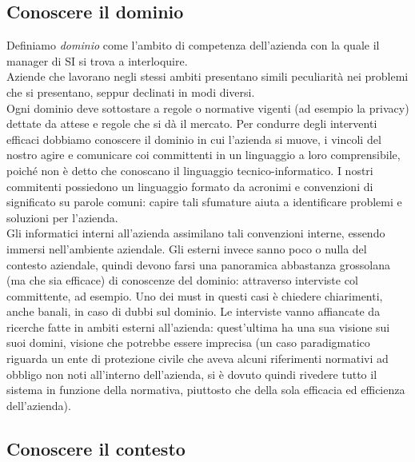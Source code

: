 \subsection{Conoscere il dominio}
Definiamo \textit{dominio} come l'ambito di competenza dell'azienda con la quale 
il manager di SI si trova a interloquire. \\
Aziende che lavorano negli stessi ambiti presentano simili peculiarit\`a  nei 
problemi che si presentano, seppur declinati in modi diversi. \\
Ogni dominio deve sottostare a regole o normative vigenti (ad esempio la 
privacy) dettate da attese e regole che si d\`a il mercato. Per condurre degli 
interventi efficaci dobbiamo conoscere il dominio in cui l'azienda si muove, i 
vincoli del nostro agire e comunicare coi committenti in un linguaggio a loro 
comprensibile, poich\'e non \`e detto che conoscano il linguaggio 
tecnico-informatico.
I nostri commitenti possiedono un linguaggio formato da acronimi e convenzioni 
di  significato su parole comuni: capire tali sfumature aiuta a identificare 
problemi e soluzioni per l'azienda. \\
Gli informatici interni all'azienda assimilano tali convenzioni interne, essendo 
immersi nell'ambiente aziendale. Gli esterni invece sanno poco o nulla del 
contesto aziendale, quindi devono farsi una panoramica abbastanza grossolana 
(ma che sia efficace) di conoscenze del dominio: attraverso interviste col 
committente, ad esempio. Uno dei must in questi casi \`e chiedere chiarimenti, 
anche banali, in caso di dubbi sul dominio. Le interviste vanno  affiancate da 
ricerche fatte in ambiti esterni all'azienda:  quest'ultima ha una sua visione 
sui suoi domini, visione che potrebbe  essere imprecisa (un caso paradigmatico 
riguarda un ente di protezione civile che aveva alcuni riferimenti normativi ad 
obbligo non noti all'interno dell'azienda, si \`e dovuto quindi rivedere tutto  
il sistema in funzione della normativa, piuttosto che della sola  efficacia ed 
efficienza dell'azienda).

\subsection{Conoscere il contesto}

